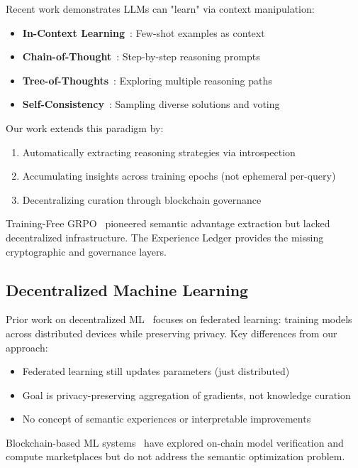 Recent work demonstrates LLMs can "learn" via context manipulation:

\begin{itemize}
    \item \textbf{In-Context Learning}~\cite{brown2020language}: Few-shot examples as context
    \item \textbf{Chain-of-Thought}~\cite{wei2022chain}: Step-by-step reasoning prompts
    \item \textbf{Tree-of-Thoughts}~\cite{yao2023tree}: Exploring multiple reasoning paths
    \item \textbf{Self-Consistency}~\cite{wang2022self}: Sampling diverse solutions and voting
\end{itemize}

Our work extends this paradigm by:
\begin{enumerate}
    \item Automatically extracting reasoning strategies via introspection
    \item Accumulating insights across training epochs (not ephemeral per-query)
    \item Decentralizing curation through blockchain governance
\end{enumerate}

Training-Free GRPO~\cite{tencentyoutu2025grpo} pioneered semantic advantage extraction but lacked decentralized infrastructure. The Experience Ledger provides the missing cryptographic and governance layers.

\subsection{Decentralized Machine Learning}

Prior work on decentralized ML~\cite{mcmahan2017communication,kairouz2021advances} focuses on federated learning: training models across distributed devices while preserving privacy. Key differences from our approach:

\begin{itemize}
    \item Federated learning still updates parameters (just distributed)
    \item Goal is privacy-preserving aggregation of gradients, not knowledge curation
    \item No concept of semantic experiences or interpretable improvements
\end{itemize}

Blockchain-based ML systems~\cite{kurtulmus2018trustless,harris2019decentralized} have explored on-chain model verification and compute marketplaces but do not address the semantic optimization problem.

